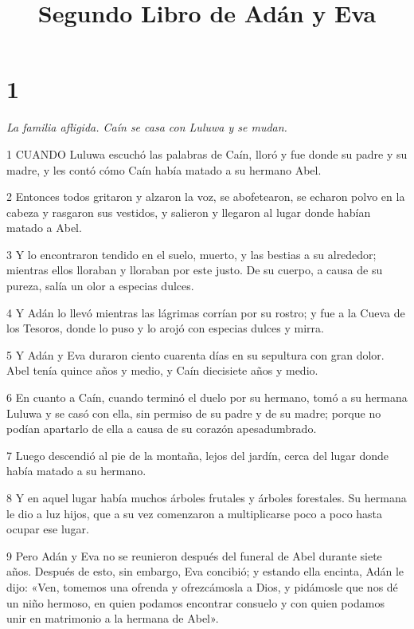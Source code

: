 

\title{Segundo Libro de Adán y Eva}

\chapter{1}

\par \textit{La familia afligida. Caín se casa con Luluwa y se mudan.}

\par 1 CUANDO Luluwa escuchó las palabras de Caín, lloró y fue donde su padre y su madre, y les contó cómo Caín había matado a su hermano Abel.

\par 2 Entonces todos gritaron y alzaron la voz, se abofetearon, se echaron polvo en la cabeza y rasgaron sus vestidos, y salieron y llegaron al lugar donde habían matado a Abel.

\par 3 Y lo encontraron tendido en el suelo, muerto, y las bestias a su alrededor; mientras ellos lloraban y lloraban por este justo. De su cuerpo, a causa de su pureza, salía un olor a especias dulces.

\par 4 Y Adán lo llevó mientras las lágrimas corrían por su rostro; y fue a la Cueva de los Tesoros, donde lo puso y lo arojó con especias dulces y mirra.

\par 5 Y Adán y Eva duraron ciento cuarenta días en su sepultura con gran dolor. Abel tenía quince años y medio, y Caín diecisiete años y medio.

\par 6 En cuanto a Caín, cuando terminó el duelo por su hermano, tomó a su hermana Luluwa y se casó con ella, sin permiso de su padre y de su madre; porque no podían apartarlo de ella a causa de su corazón apesadumbrado.

\par 7 Luego descendió al pie de la montaña, lejos del jardín, cerca del lugar donde había matado a su hermano.

\par 8 Y en aquel lugar había muchos árboles frutales y árboles forestales. Su hermana le dio a luz hijos, que a su vez comenzaron a multiplicarse poco a poco hasta ocupar ese lugar.

\par 9 Pero Adán y Eva no se reunieron después del funeral de Abel durante siete años. Después de esto, sin embargo, Eva concibió; y estando ella encinta, Adán le dijo: «Ven, tomemos una ofrenda y ofrezcámosla a Dios, y pidámosle que nos dé un niño hermoso, en quien podamos encontrar consuelo y con quien podamos unir en matrimonio a la hermana de Abel».

